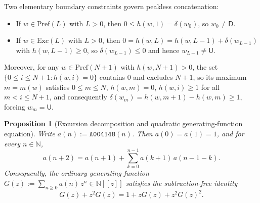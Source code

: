 \documentclass[11pt]{article}
\newcommand{\llbracket}{[\![}
\newcommand{\rrbracket}{]\!]}
\newtheorem{proposition}[theorem]{Proposition}
\theoremstyle{definition}
\newcommand{\N}{\mathbb{N}}
\newcommand{\seq}[1]{\texttt{#1}}
\newcommand{\StepU}{\mathsf{U}}
\newcommand{\StepD}{\mathsf{D}}
\newcommand{\Exc}{\mathrm{Exc}}
\newcommand{\Pref}{\mathrm{Pref}}
\begin{document}
Two elementary boundary constraints govern peakless concatenation:
\begin{itemize}
\item If $w \in \Pref(L)$ with $L > 0$, then $0 \le h(w, 1) = \delta(w_0)$, so $w_0 \ne \StepD$.
\item If $w \in \Exc(L)$ with $L > 0$, then $0 = h(w, L) = h(w, L-1) + \delta(w_{L-1})$ with $h(w, L-1) \ge 0$, so $\delta(w_{L-1}) \le 0$ and hence $w_{L-1} \ne \StepU$.
\end{itemize}
Moreover, for any $w \in \Pref(N+1)$ with $h(w, N+1) > 0$, the set $\{0 \le i \le N+1 : h(w, i) = 0\}$ contains $0$ and excludes $N+1$, so its maximum $m = m(w)$ satisfies $0 \le m \le N$, $h(w, m) = 0$, $h(w, i) \ge 1$ for all $m < i \le N+1$, and consequently $\delta(w_m) = h(w, m+1) - h(w, m) \ge 1$, forcing $w_m = \StepU$.

\begin{proposition}[Excursion decomposition and quadratic generating-function equation]
\label{prop:a004148-rec}
Write $a(n) := \seq{A004148}(n)$. Then $a(0) = a(1) = 1$, and for every $n \in \N$,
\begin{equation}
\label{eq:a004148-rec}
a(n + 2) = a(n + 1) + \sum_{k=0}^{n-1} a(k + 1)\,a(n - 1 - k).
\end{equation}
Consequently, the ordinary generating function $G(z) := \sum_{n \ge 0} a(n)\,z^n \in \N\llbracket z \rrbracket$ satisfies the subtraction-free identity
\begin{equation}
\label{eq:G-quad}
G(z) + z^2 G(z) = 1 + z G(z) + z^2 G(z)^2.
\end{equation}
\end{proposition}
\end{document}
